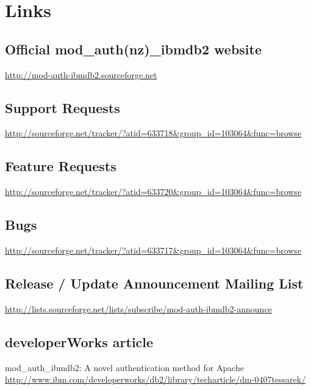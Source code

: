 \section{Links}
\subsection{Official mod\_auth(nz)\_ibmdb2 website}
\url{http://mod-auth-ibmdb2.sourceforge.net}
\subsection{Support Requests}
\url{http://sourceforge.net/tracker/?atid=633718&group_id=103064&func=browse}
\subsection{Feature Requests}
\url{http://sourceforge.net/tracker/?atid=633720&group_id=103064&func=browse}
\subsection{Bugs}
\url{http://sourceforge.net/tracker/?atid=633717&group_id=103064&func=browse}
\subsection{Release / Update Announcement Mailing List}
\url{http://lists.sourceforge.net/lists/subscribe/mod-auth-ibmdb2-announce}
\subsection{developerWorks article}
mod\_auth\_ibmdb2: A novel authentication method for Apache\\
\url{http://www.ibm.com/developerworks/db2/library/techarticle/dm-0407tessarek/}